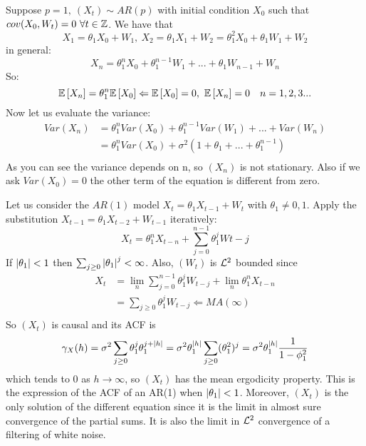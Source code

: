 \begin{remark}
    Suppose $p=1,\ (X_t)\sim AR(p)$ with initial condition $X_0$ such that $cov(X_0,W_t)=0\ \forall t\in\mathbb{Z}$. We have that
    \[
        X_1=\theta_1X_0+W_1,\ X_2=\theta_1X_1+W_2=\theta_1^2X_0+\theta_1W_1+W_2  
    \]
    in general:
    \[
        X_n=\theta_1^nX_0+\theta_1^{n-1}W_1+...+\theta_1W_{n-1}+W_n 
    \]
    So:
    \[
        \expect{X_n}=\theta_1^n\expect{X_0}\Leftarrow\expect{X_0}=0,\ \expect{X_n}=0\ \ \ n=1,2,3...  
    \]
    Now let us evaluate the variance:
    \begin{equation*}
        \begin{split}
            Var(X_n)&=\theta_1^nVar(X_0)+\theta_1^{n-1}Var(W_1)+...+Var(W_n)\\
            &=\theta_1^nVar(X_0)+\sigma^2(1+\theta_1+...+\theta_1^{n-1})\\  
        \end{split}
    \end{equation*}
    As you can see the variance depends on n, so $(X_n)$ is not stationary. Also if we ask $Var(X_0)=0$ the other term of the equation is different from zero.
\end{remark}

Let us consider the $AR(1)$ model $X_t=\theta_1X_{t-1}+W_t$ with $\theta_1\ne0,1$. Apply the substitution $X_{t-1}=\theta_1X_{t-2}+W_{t-1}$ iteratively:
\[
    X_t=\theta_1^nX_{t-n}+\sum_{j=0}^{n-1}\theta_1^jW{t-j}  
\]
If $\left|\theta_1\right|<1$ then $\sum_{j\ge0}\left|\theta_1\right|^j<\infty$. Also, $(W_t)$ is $\mathcal{L}^{2}$ bounded since
\begin{equation*}
    \begin{split}
        X_t&=\lim_{n}\sum_{j=0}^{n-1}\theta_1^jW_{t-j}+\lim_n\theta_1^nX_{t-n}\\
        &=\sum_{j\ge0}\theta_1^jW_{t-j}\Leftarrow MA(\infty)\\
    \end{split}
\end{equation*}
So $(X_t)$ is causal and its ACF is
\[
    \gamma_X(h)=\sigma^2\sum_{j\ge0}\theta_1^j\theta_1^{j+\left|h\right|}=\sigma^2\theta_1^{\left|h\right|}\sum_{j\ge0}(\theta_1^2)^j=\sigma^2\theta_1^{\left|h\right|}\frac{1}{1-\phi_1^2}  
\]
which tends to $0$ as $h\to\infty$, so $(X_t)$ has the mean ergodicity property. This is the expression of the ACF of an AR(1) when $\left|\theta_1\right|<1$. Moreover, $(X_t)$ is the only solution of the different equation since it is the limit in almost sure convergence of the partial sums. It is also the limit in $\mathcal{L}^{2}$ convergence of a filtering of white noise.

